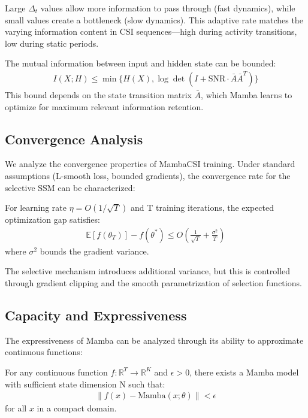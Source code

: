 \documentclass[journal]{IEEEtran}
\begin{document}
Large $\Delta_t$ values allow more information to pass through (fast dynamics), while small values create a bottleneck (slow dynamics). This adaptive rate matches the varying information content in CSI sequences—high during activity transitions, low during static periods.

The mutual information between input and hidden state can be bounded:
\begin{align}
I(X; H) \leq \min\{H(X), \log \det(I + \text{SNR} \cdot \bar{A}\bar{A}^T)\}
\end{align}
This bound depends on the state transition matrix $\bar{A}$, which Mamba learns to optimize for maximum relevant information retention.

\subsection{Convergence Analysis}

We analyze the convergence properties of MambaCSI training. Under standard assumptions (L-smooth loss, bounded gradients), the convergence rate for the selective SSM can be characterized:

\begin{theorem}
For learning rate $\eta = O(1/\sqrt{T})$ and T training iterations, the expected optimization gap satisfies:
\begin{align}
\mathbb{E}[f(\theta_T)] - f(\theta^*) \leq O\left(\frac{1}{\sqrt{T}} + \frac{\sigma^2}{T}\right)
\end{align}
where $\sigma^2$ bounds the gradient variance.
\end{theorem}

The selective mechanism introduces additional variance, but this is controlled through gradient clipping and the smooth parametrization of selection functions.

\subsection{Capacity and Expressiveness}

The expressiveness of Mamba can be analyzed through its ability to approximate continuous functions:

\begin{theorem}
For any continuous function $f: \mathbb{R}^T \to \mathbb{R}^K$ and $\epsilon > 0$, there exists a Mamba model with sufficient state dimension N such that:
\begin{align}
\|f(x) - \text{Mamba}(x; \theta)\| < \epsilon
\end{align}
for all $x$ in a compact domain.
\end{theorem}
\end{document}
